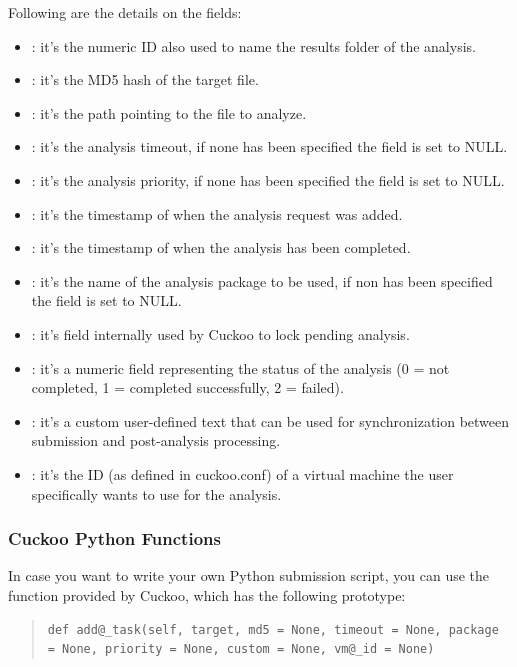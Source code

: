 \documentclass[letterpaper,10pt,english]{sphinxmanual}
\begin{document}
Following are the details on the fields:
\begin{itemize}
\item {} 
: it's the numeric ID also used to name the results folder of the analysis.

\item {} 
: it's the MD5 hash of the target file.

\item {} 
: it's the path pointing to the file to analyze.

\item {} 
: it's the analysis timeout, if none has been specified the field is set to NULL.

\item {} 
: it's the analysis priority, if none has been specified the field is set to NULL.

\item {} 
: it's the timestamp of when the analysis request was added.

\item {} 
: it's the timestamp of when the analysis has been completed.

\item {} 
: it's the name of the analysis package to be used, if non has been specified the field is set to NULL.

\item {} 
: it's field internally used by Cuckoo to lock pending analysis.

\item {} 
: it's a numeric field representing the status of the analysis (0 = not completed, 1 = completed successfully, 2 = failed).

\item {} 
: it's a custom user-defined text that can be used for synchronization between submission and post-analysis processing.

\item {} 
: it's the ID (as defined in cuckoo.conf) of a virtual machine the user specifically wants to use for the analysis.

\end{itemize}


\subsubsection{Cuckoo Python Functions}
\label{usage/submit:cuckoo-python-functions}
In case you want to write your own Python submission script, you can use the
 function provided by Cuckoo, which has the following prototype:
\begin{quote}

\begin{Verbatim}[commandchars=@\[\]]
def add@_task(self, target, md5 = None, timeout = None, package = None, priority = None, custom = None, vm@_id = None)
\end{Verbatim}
\end{quote}
\end{document}
